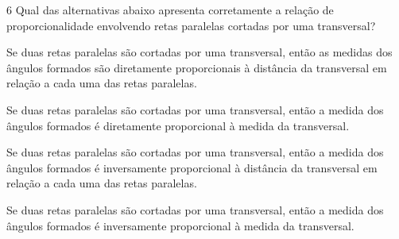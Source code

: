 
\num{6}  Qual das alternativas abaixo apresenta corretamente a relação de
proporcionalidade envolvendo retas paralelas cortadas por uma
transversal?

\begin{escolha}
\item Se duas retas paralelas são cortadas por uma transversal, então as
medidas dos ângulos formados são diretamente proporcionais à distância
da transversal em relação a cada uma das retas paralelas.
\item Se duas retas paralelas são cortadas por uma transversal, então a
medida dos ângulos formados é diretamente proporcional à medida da
transversal.
\item Se duas retas paralelas são cortadas por uma transversal, então a
medida dos ângulos formados é inversamente proporcional à distância da
transversal em relação a cada uma das retas paralelas.
\item Se duas retas paralelas são cortadas por uma transversal, então a
medida dos ângulos formados é inversamente proporcional à medida da
transversal.
\end{escolha}



